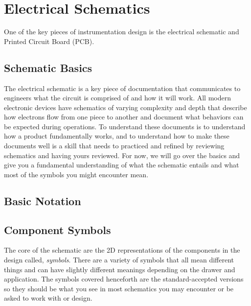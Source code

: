 %

\chapter{Electrical Schematics}
\setchapterpreamble[u]{\margintoc}

One of the key pieces of instrumentation design is the electrical schematic and Printed Circuit Board (PCB).

\section{Schematic Basics}
The electrical schematic is a key piece of documentation that communicates to engineers what the circuit is comprised of and how it will work.
All modern electronic devices have schematics of varying complexity and depth that describe how electrons flow from one piece to another and document what behaviors can be expected during operations.
To understand these documents is to understand how a product fundamentally works, and to understand how to make these documents well is a skill that needs to practiced and refined by reviewing schematics and having yours reviewed.
For now, we will go over the basics and give you a fundamental understanding of what the schematic entails and what most of the symbols you might encounter mean.
\section{Basic Notation}


\section{Component Symbols}
The core of the schematic are the 2D representations of the components in the design called, \emph{symbols}. 
There are a variety of symbols that all mean different things and can have slightly different meanings depending on the drawer and application.
The symbols covered henceforth are the standard-accepted versions so they should be what you see in most schematics you may encounter or be asked to work with or design.

